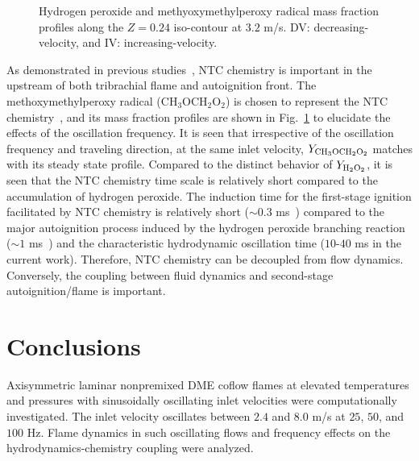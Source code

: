 \documentclass[review,3p,times]{elsarticle}
\begin{document}
\begin{figure}[t]
  \centering
  \scriptsize
  \resizebox{0.49\textwidth}{!}{}
  \resizebox{0.49\textwidth}{!}{}
  \normalsize
  \vspace{-0.2in}
  \caption{Hydrogen peroxide and methyoxymethylperoxy radical mass fraction profiles along the $Z = 0.24$ iso-contour at $3.2$ m/s.  DV: decreasing-velocity, and IV: increasing-velocity.}
  \label{fig:species_frq}
\end{figure}

As demonstrated in previous studies~\cite{deng15,deng15b}, NTC chemistry is important in the upstream of both tribrachial flame and autoignition front.  The methoxymethylperoxy radical (CH$_3$OCH$_2$O$_2$) is chosen to represent the NTC chemistry~\cite{krisman14}, and its mass fraction profiles are shown in Fig.~\ref{fig:species_frq} to elucidate the effects of the oscillation frequency.  It is seen that irrespective of the oscillation frequency and traveling direction, at the same inlet velocity, $Y_{\rm CH_3OCH_2O_2}$ matches with its steady state profile.  Compared to the distinct behavior of $Y_{\rm H_2O_2}$, it is seen that the NTC chemistry time scale is relatively short compared to the accumulation of hydrogen peroxide.  The induction time for the first-stage ignition facilitated by NTC chemistry is relatively short ($\sim 0.3$ ms~\cite{deng15b}) compared to the major autoignition process induced by the hydrogen peroxide branching reaction ($\sim 1$ ms~\cite{deng15b}) and the characteristic hydrodynamic oscillation time ($10$-$40$ ms in the current work).  Therefore, NTC chemistry can be decoupled from flow dynamics.  Conversely, the coupling between fluid dynamics and second-stage autoignition/flame is important.       



\section{Conclusions}

Axisymmetric laminar nonpremixed DME coflow flames at elevated temperatures and pressures with sinusoidally oscillating inlet velocities were computationally investigated.  The inlet velocity oscillates between $2.4$ and $8.0$ m/s at $25$, $50$, and $100$ Hz.  Flame dynamics in such oscillating flows and frequency effects on the hydrodynamics-chemistry coupling were analyzed.
\end{document}
